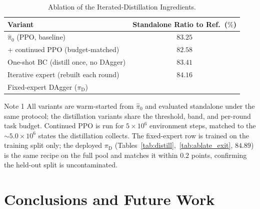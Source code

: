 \documentclass[journal, twoside]{IEEEtran}
\newcommand{\limebox}[1]{\setlength{\fboxsep}{0pt}{\colorbox{lime}{#1}}}
\newcommand{\rev}[1]{\begingroup\color{magenta}#1\endgroup}
\begin{document}
\begin{table}[!htbp]
\centering
\rev{
\caption{\rev{Ablation of the Iterated-Distillation Ingredients.}}
\label{tab:ablate_ablation}
\begin{threeparttable}
\begin{tabular}{lc}
\toprule
Variant & \shortstack{Standalone\\ Ratio to Ref.\ ($\%$)} \\
\midrule
$\hat{\pi}_{0}$ (PPO, baseline)                      & $83.25$ \\
\;+ continued PPO (budget-matched)                   & $82.58$ \\
One-shot BC (distill once, no DAgger)                & $83.41$ \\
Iterative expert (rebuilt each round)                & $84.16$ \\
Fixed-expert DAgger ($\pi_{\mathrm{D}}$)             & \limebox{$85.08$} \\
\bottomrule
\end{tabular}
\begin{tablenotes}
    \item[Note 1] All variants are warm-started from $\hat{\pi}_{0}$ and evaluated standalone under the same protocol; the distillation variants share the threshold, band, and per-round task budget. Continued PPO is run for $5{\times}10^{6}$ environment steps, matched to the $\sim\!5.0{\times}10^{6}$ states the distillation collects. The fixed-expert row is trained on the training split only; the deployed $\pi_{\mathrm{D}}$ (Tables~\ref{tab:distill},~\ref{tab:ablate_exit}, $84.89$) is the same recipe on the full pool and matches it within $0.2$ points, confirming the held-out split is uncontaminated.
\end{tablenotes}
\end{threeparttable}}
\end{table}

\section{Conclusions and Future Work}
\label{sec:conclusion}
\end{document}
